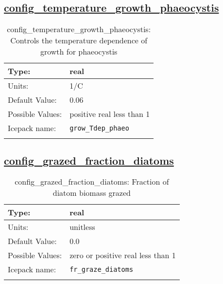 \subsection[config\_temperature\_growth\_phaeocystis]{\hyperref[sec:nm_tab_biogeochemistry]{config\_temperature\_growth\_phaeocystis}}
\label{subsec:nm_sec_config_temperature_growth_phaeocystis}
\begin{center}
\begin{longtable}{| p{2.0in} || p{4.0in} |}
    \hline
    Type: & real \\
    \hline
    Units: & \si{1/C} \\
    \hline
    Default Value: & 0.06 \\
    \hline
    Possible Values: & positive real less than 1 \\
    \hline
    \hline
    Icepack name: & \verb+grow_Tdep_phaeo+ \\
    \caption{config\_temperature\_growth\_phaeocystis: Controls the temperature dependence of growth for phaeocystis}
\end{longtable}
\end{center}
\subsection[config\_grazed\_fraction\_diatoms]{\hyperref[sec:nm_tab_biogeochemistry]{config\_grazed\_fraction\_diatoms}}
\label{subsec:nm_sec_config_grazed_fraction_diatoms}
\begin{center}
\begin{longtable}{| p{2.0in} || p{4.0in} |}
    \hline
    Type: & real \\
    \hline
    Units: & \si{unitless} \\
    \hline
    Default Value: & 0.0 \\
    \hline
    Possible Values: & zero or positive real less than 1 \\
    \hline
    \hline
    Icepack name: & \verb+fr_graze_diatoms+ \\
    \caption{config\_grazed\_fraction\_diatoms: Fraction of diatom biomass grazed}
\end{longtable}
\end{center}
